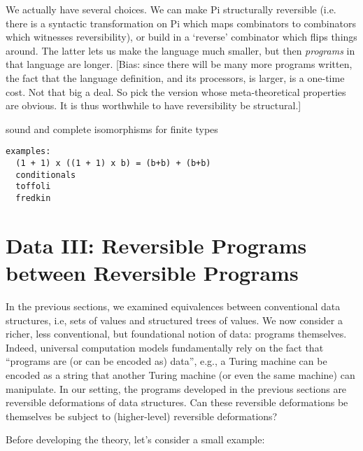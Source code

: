 \documentclass{article}
\begin{document}
We actually have several choices. We can make Pi structurally reversible
(i.e. there is a syntactic transformation on Pi which maps combinators
to combinators which witnesses reversibility), or build in a `reverse'
combinator which flips things around. The latter lets us make the
language much smaller, but then \emph{programs} in that language are longer.
[Bias: since there will be many more programs written, the fact that the
language definition, and its processors, is larger, is a one-time cost.
Not that big a deal. So pick the version whose meta-theoretical
properties are obvious. It is thus worthwhile to have reversibility be
structural.]

sound and complete isomorphisms for finite types

\begin{verbatim}
examples: 
  (1 + 1) x ((1 + 1) x b) = (b+b) + (b+b)
  conditionals
  toffoli
  fredkin
\end{verbatim}

\section{Data III: Reversible Programs between Reversible Programs}

In the previous sections, we examined equivalences between
conventional data structures, i.e, sets of values and structured trees
of values. We now consider a richer, less conventional, but
foundational notion of data: programs themselves. Indeed, universal
computation models fundamentally rely on the fact that ``programs are
(or can be encoded as) data'', e.g., a Turing machine can be encoded
as a string that another Turing machine (or even the same machine) can
manipulate. In our setting, the programs developed in the previous
sections are reversible deformations of data structures. Can these
reversible deformations be themselves be subject to (higher-level)
reversible deformations? 

Before developing the theory, let's consider a small example:
\end{document}

